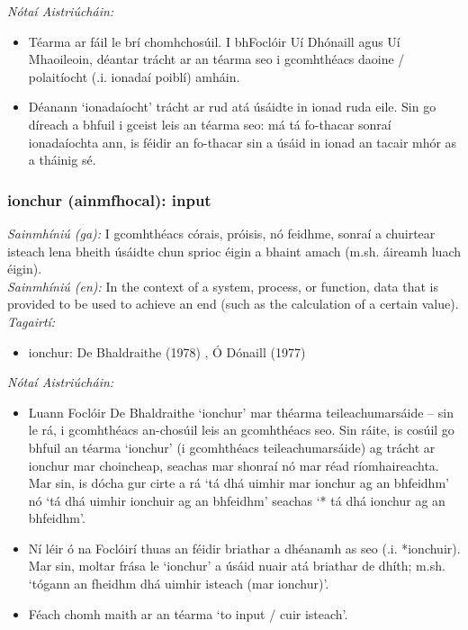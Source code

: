 \documentclass{article}
\begin{document}
 \noindent \textit{Nótaí Aistriúcháin:}
\begin{itemize}
	\item Téarma ar fáil le brí chomhchosúil. I bhFoclóir Uí Dhónaill agus Uí Mhaoileoin, déantar trácht ar an téarma seo i gcomhthéacs daoine / polaitíocht (.i. ionadaí poiblí) amháin.
	\item Déanann `ionadaíocht' trácht ar rud atá úsáidte in ionad ruda eile. Sin go díreach a bhfuil i gceist leis an téarma seo: má tá fo-thacar sonraí ionadaíochta ann, is féidir an fo-thacar sin a úsáid in ionad an tacair mhór as a tháinig sé.
\end{itemize}


\subsubsection*{ionchur (ainmfhocal): input}
 \noindent \textit{Sainmhíniú (ga):} I gcomhthéacs córais, próisis, nó feidhme, sonraí a chuirtear isteach lena bheith úsáidte chun sprioc éigin a bhaint amach (m.sh. áireamh luach éigin).
\\
 \noindent \textit{Sainmhíniú (en):} In the context of a system, process, or function, data that is provided to be used to achieve an end (such as the calculation of a certain value).
\\
 \noindent \textit{Tagairtí:}
\begin{itemize}
	\item ionchur: De Bhaldraithe (1978) \cite{de-bhaldraithe}, Ó Dónaill (1977) \cite{odonaill}
\end{itemize}

 \noindent \textit{Nótaí Aistriúcháin:}
\begin{itemize}
	\item Luann Foclóir De Bhaldraithe `ionchur' mar théarma teileachumarsáide -- sin le rá, i gcomhthéacs an-chosúil leis an gcomhthéacs seo. Sin ráite, is cosúil go bhfuil an téarma `ionchur' (i gcomhthéacs teileachumarsáide) ag trácht ar ionchur mar choincheap, seachas mar shonraí nó mar réad ríomhaireachta. Mar sin, is dócha gur cirte a rá `tá dhá uimhir mar ionchur ag an bhfeidhm' nó `tá dhá uimhir ionchuir ag an bhfeidhm' seachas `* tá dhá ionchur ag an bhfeidhm'.
	\item Ní léir ó na Foclóirí thuas an féidir briathar a dhéanamh as seo (.i. *ionchuir). Mar sin, moltar frása le `ionchur' a úsáid nuair atá briathar de dhíth; m.sh. `tógann an fheidhm dhá uimhir isteach (mar ionchur)'.
	\item Féach chomh maith ar an téarma `to input / cuir isteach'.
\end{itemize}
\end{document}
